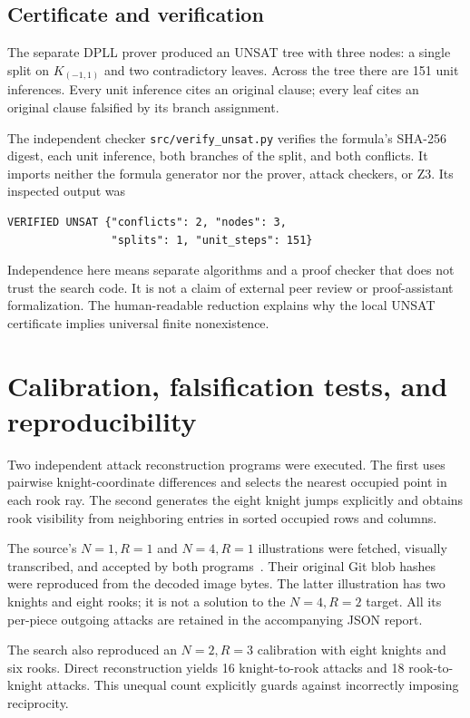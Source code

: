 \documentclass[11pt]{article}
\begin{document}
\subsection{Certificate and verification}
The separate DPLL prover produced an UNSAT tree with three nodes: a single
split on \(K_{(-1,1)}\) and two contradictory leaves. Across the tree there
are 151 unit inferences. Every unit inference cites an original clause;
every leaf cites an original clause falsified by its branch assignment.

The independent checker \texttt{src/verify\_unsat.py} verifies the formula's
SHA-256 digest, each unit inference, both branches of the split, and both
conflicts. It imports neither the formula generator nor the prover, attack
checkers, or Z3. Its inspected output was
\begin{verbatim}
VERIFIED UNSAT {"conflicts": 2, "nodes": 3,
                "splits": 1, "unit_steps": 151}
\end{verbatim}
Independence here means separate algorithms and a proof checker that does
not trust the search code. It is not a claim of external peer review or
proof-assistant formalization. The human-readable reduction explains why
the local UNSAT certificate implies universal finite nonexistence.

\section{Calibration, falsification tests, and reproducibility}
Two independent attack reconstruction programs were executed. The first
uses pairwise knight-coordinate differences and selects the nearest
occupied point in each rook ray. The second generates the eight knight
jumps explicitly and obtains rook visibility from neighboring entries in
sorted occupied rows and columns.

The source's \(N=1,R=1\) and \(N=4,R=1\) illustrations were fetched,
visually transcribed, and accepted by both programs~\cite{n1r1,n4r1}.
Their original Git blob hashes were reproduced from the decoded image
bytes. The latter illustration has two knights and eight rooks; it is
not a solution to the \(N=4,R=2\) target. All its per-piece outgoing attacks
are retained in the accompanying JSON report.

The search also reproduced an \(N=2,R=3\) calibration with eight knights
and six rooks. Direct reconstruction yields 16 knight-to-rook attacks and
18 rook-to-knight attacks. This unequal count explicitly guards against
incorrectly imposing reciprocity.
\end{document}
